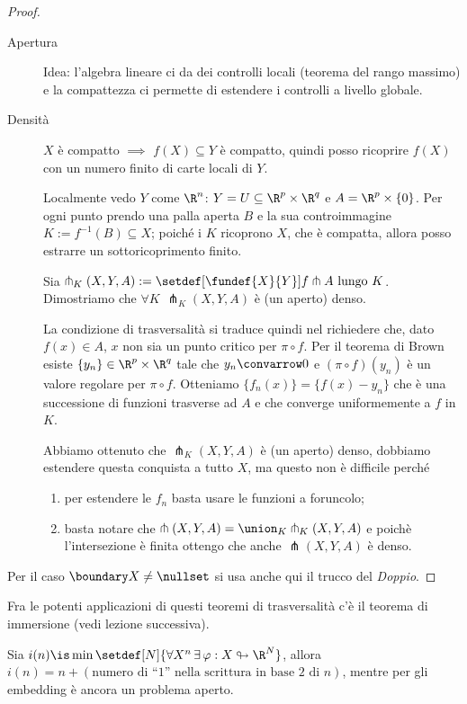 \begin{proof}~
\begin{description}
\item [Apertura]
Idea: l'algebra lineare ci da dei controlli locali (teorema del rango massimo) e la compattezza ci permette di estendere i controlli a livello globale.
\item [Densità]
$X$ è compatto $\implies$ $f(X) \subseteq Y$ è compatto, quindi posso ricoprire $f(X)$ con un numero finito di carte locali di $Y$.

Localmente vedo $Y$ come $\R^n$: $Y = U \subseteq \R^p \times \R^q$ e $A = \R^p \times \{ 0 \}$. Per ogni punto prendo una palla aperta $B$ e la sua controimmagine $K := f^{-1}(B) \subseteq X$; poiché i $K$ ricoprono $X$, che è compatta, allora posso estrarre un sottoricoprimento finito.

Sia $\pitchfork_K(X,Y,A) := \setdef[\fundef{X}{Y}]{f \pitchfork A \text{ lungo } K}$. Dimostriamo che $\forall K$ $\pitchfork_K(X,Y,A)$ è (un aperto) denso. 
\begin{center}
  
\end{center}
La condizione di trasversalità si traduce quindi nel richiedere che, dato $f(x) \in A$, $x$ non sia un punto critico per $\pi \circ f$. Per il teorema di Brown esiste $\{ y_n \} \in \R^p \times \R^q$ tale che $y_n \convarrow 0$ e $(\pi \circ f)(y_n)$ è un valore regolare per $\pi \circ f$. Otteniamo $\{ f_n(x) \} = \{ f(x) - y_n \}$ che è una successione di funzioni trasverse ad $A$ e che converge uniformemente a $f$  in $K$.

Abbiamo ottenuto che $\pitchfork_K(X,Y,A)$ è (un aperto) denso, dobbiamo estendere questa conquista a tutto $X$, ma questo non è difficile perché 
\begin{enumerate}
\item per estendere le $f_n$ basta  usare le funzioni a foruncolo;
\item basta notare che $\pitchfork(X,Y,A) = \union_K \pitchfork_K(X,Y,A)$ e poichè l'intersezione è finita ottengo che anche $\pitchfork(X,Y,A)$ è denso.
\end{enumerate}
\end{description}

Per il caso $\boundary X \neq \nullset$ si usa anche qui il trucco del \emph{Doppio}.
\end{proof}

Fra le potenti applicazioni di questi teoremi di trasversalità c'è il teorema di immersione (vedi lezione successiva).

\begin{teo}
Sia $i(n) \is\min\setdef[N]{\forall X^n\,\exists\,\varphi: X \looparrowright \R^N}$, allora $i(n) = n + (\text{numero di ``1'' nella scrittura in base 2 di $n$})$, mentre per gli embedding è ancora un problema aperto.
\end{teo}
